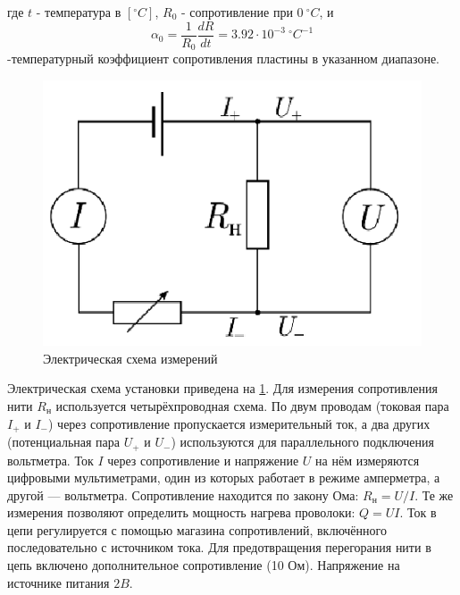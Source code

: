 \documentclass[12pt]{article}
\begin{document}
        где $t$ - температура в $[^{\circ} C]$, $R_0$ - сопротивление при $0\ ^{\circ} C$, и
        \[
            \alpha_0 = \frac{1}{R_0}\frac{dR}{dt} = 3.92\cdot 10^{-3}\ ^{\circ} C^{-1}
        \]
        -температурный коэффициент сопротивления пластины в указанном диапазоне.
        \begin{figure}[H]
            \centering
            \includegraphics[width=0.4\linewidth]{electricity.png}
            \caption{Электрическая схема измерений}
            \label{electricity}
        \end{figure}
        Электрическая схема установки приведена на \ref{electricity}. Для измерения сопротивления нити $R_{\text{н}}$
        используется четырёхпроводная схема. По двум проводам (токовая пара $I_{+}$ и $I_{-}$) через сопротивление
        пропускается измерительный ток, а два других (потенциальная пара $U_{+}$ и $U_{-}$) используются
        для параллельного подключения вольтметра. Ток $I$ через сопротивление и напряжение $U$ на нём
        измеряются цифровыми мультиметрами, один из которых работает в режиме амперметра, а другой — вольтметра.
        Сопротивление находится по закону Ома: $R_{\text{н}} = U/I$. Те же измерения позволяют определить мощность
        нагрева проволоки: $Q = UI$. Ток в цепи регулируется с помощью магазина сопротивлений, включённого
        последовательно с источником тока. Для предотвращения перегорания нити в цепь включено дополнительное
        сопротивление (10 Ом). Напряжение на источнике питания $2 B$.
\end{document}

